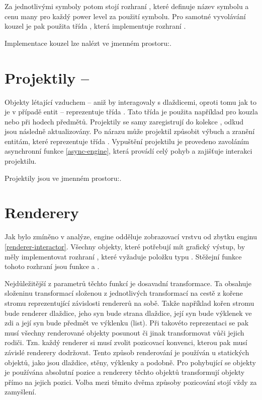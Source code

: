 Za jednotlivými symboly potom stojí rozhraní  , které definuje název symbolu a cenu many pro každý power level
za použití symbolu. Pro samotné vyvolávání kouzel je pak použita třída , která implementuje rozhraní
.

Implementace kouzel lze nalézt ve jmenném prostoru:\newline {}.

\section{Projektily -- }
Objekty létající vzduchem -- aniž by interagovaly s dlaždicemi, oproti tomu jak to je v případě entit --  reprezentuje třída .
Tato třída je použita například pro kouzla nebo při hodech předmětů. Projektily se samy zaregistrují do kolekce ,
odkud jsou následně aktualizovány. Po nárazu může projektil způsobit výbuch a zranění entitám, které reprezentuje třída . 
Vypuštění projektilu je provedeno zavoláním asynchronní funkce  \vref{async-engine}, která provádí 
celý pohyb a zajišťuje interakci projektilu.

Projektily jsou ve jmenném prostoru:\newline {}.


\section{Renderery}
Jak bylo zmíněno v analýze, engine odděluje zobrazovací vrstvu od zbytku enginu \vref{renderer-interactor}. Všechny objekty,
které potřebují mít grafický výstup, by měly implementovat rozhraní , které vyžaduje položku typu . 
Stěžejní funkce tohoto rozhraní jsou funkce  a . 

Nejdůležitější z parametrů těchto funkcí je dosavadní transformace. Ta obsahuje složeninu transformací složenou z jednotlivých
transformací na cestě z kořene stromu reprezentující závislosti rendererů na sobě. Takže například kořen stromu bude renderer
dlaždice, jeho syn bude strana dlaždice, její syn bude výklenek ve zdi a její syn bude předmět ve
výklenku (list). Při takovéto reprezentaci se pak musí všechny renderované objekty posunout či jinak transformovat vůči jejich rodiči.
Tzn. každý renderer si musí zvolit pozicovací konvenci, kterou pak musí závislé renderery dodržovat. Tento způsob renderování je používán u statických objektů, jako
jsou dlaždice, stěny, výklenky a podobně. Pro pohybující se objekty je používána absolutní pozice a renderery
těchto objektů transformují objekty přímo na jejich pozici. Volba mezi těmito dvěma způsoby pozicování stojí vždy za zamyšlení.


